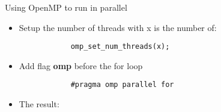 \documentclass{article}
\begin{document}
Using OpenMP to run in parallel

\begin{itemize}
	\item Setup the number of threads with x is the number of:
		\begin{verbatim}
			omp_set_num_threads(x);
		\end{verbatim}
	\item Add flag \textbf{omp} before the for loop
		\begin{verbatim}
			#pragma omp parallel for
		\end{verbatim}
	\item The result:
\end{itemize}
\end{document}
